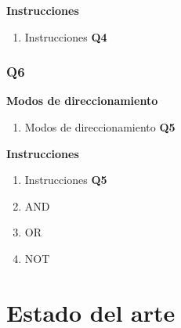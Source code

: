\textbf{Instrucciones}
\begin{enumerate}
\item Instrucciones \textbf{Q4}
\end{enumerate}

\subsubsection{Q6}

\textbf{Modos de direccionamiento}
\begin{enumerate}
\item Modos de direccionamiento \textbf{Q5}
\end{enumerate}

\textbf{Instrucciones}
\begin{enumerate}
\item Instrucciones \textbf{Q5}
\item AND
\item OR
\item NOT
\end{enumerate}


\section{Estado del arte}

